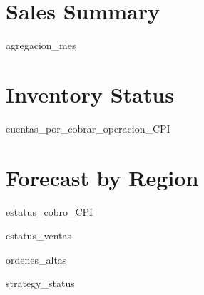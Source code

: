 \documentclass{article}
\begin{document}
\section*{Sales Summary}
{{agregacion_mes}}

\section*{Inventory Status}
{{cuentas_por_cobrar_operacion_CPI}}

\section*{Forecast by Region}
{{estatus_cobro_CPI}}

{{estatus_ventas}}

{{ordenes_altas}}

{{strategy_status}}
\end{document}
